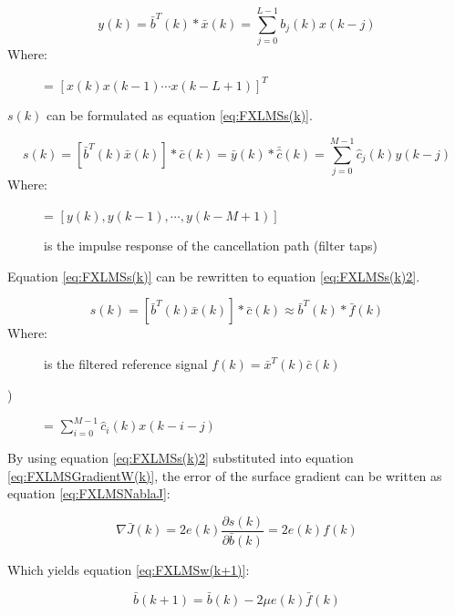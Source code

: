 \begin{equation}\label{eq:FXLMSOutput}
y(k) = \bar{b}^T(k)*\bar{x}(k) = \sum_{j=0}^{L-1} b_j(k)x(k-j)
\end{equation}
Where:
\begin{description}
	\item[] = $[x(k) x(k-1) \cdots x(k-L+1)]^T $
\end{description}
$s(k)$ can be formulated as equation \ref{eq:FXLMSs(k)}.

\begin{equation}\label{eq:FXLMSs(k)}
s(k) = [\bar{b}^T(k)\bar{x}(k)]*\bar{c}(k) = \bar{y}(k)*\bar{\hat{c}}(k) = \sum_{j=0}^{M-1}\hat{c}_j(k)y(k-j)
\end{equation}
Where:
\begin{description}
	\item[] = $[ y(k), y(k-1), \cdots, y(k-M+1)]$
	\item[] is the impulse response of the cancellation path (filter taps)
\end{description}

Equation \ref{eq:FXLMSs(k)} can be rewritten to equation \ref{eq:FXLMSs(k)2}.

\begin{equation}\label{eq:FXLMSs(k)2}
s(k) = [\bar{b}^T(k)\bar{x}(k)]*\bar{c}(k)\approx \bar{b}^T(k)*\bar{f}(k)
\end{equation}
Where:
\begin{description}
	\item[] is the filtered reference signal $f(k)=\bar{x}^T(k)\bar{c}(k)$
	\item[)] = $\sum_{i=0}^{M-1}\hat{c}_i(k)x(k-i-j)$
\end{description}

By using equation \ref{eq:FXLMSs(k)2} substituted into equation \ref{eq:FXLMSGradientW(k)}, the error of the surface gradient can be written as equation \ref{eq:FXLMSNablaJ}:

\begin{equation}\label{eq:FXLMSNablaJ}
\nabla \bar{J}(k) = 2e(k)\frac{\partial s(k)}{\partial \bar{b}(k)} = 2e(k)f(k)
\end{equation}

Which yields equation \ref{eq:FXLMSw(k+1)}:

\begin{equation}\label{eq:FXLMSw(k+1)}
\bar{b}(k+1) = \bar{b}(k) - 2\mu e(k)\bar{f}(k)
\end{equation}

